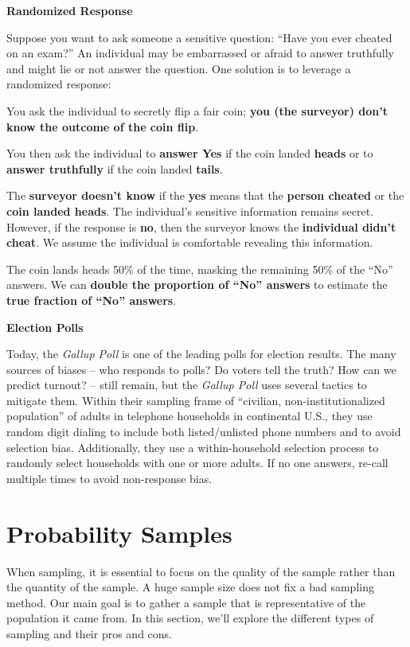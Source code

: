 \documentclass[
  letterpaper,
  DIV=11,
  numbers=noendperiod]{scrreprt}
\begin{document}
\textbf{Randomized Response}

Suppose you want to ask someone a sensitive question: ``Have you ever
cheated on an exam?'' An individual may be embarrassed or afraid to
answer truthfully and might lie or not answer the question. One solution
is to leverage a randomized response:

You ask the individual to secretly flip a fair coin; \textbf{you (the
surveyor) don't know the outcome of the coin flip}.

You then ask the individual to \textbf{answer Yes} if the coin landed
\textbf{heads} or to \textbf{answer truthfully} if the coin landed
\textbf{tails}.

The \textbf{surveyor doesn't know} if the \textbf{yes} means that the
\textbf{person cheated} or the \textbf{coin landed heads}. The
individual's sensitive information remains secret. However, if the
response is \textbf{no}, then the surveyor knows the \textbf{individual
didn't cheat}. We assume the individual is comfortable revealing this
information.

The coin lands heads 50\% of the time, masking the remaining 50\% of the
``No'' answers. We can \textbf{double the proportion of ``No'' answers}
to estimate the \textbf{true fraction of ``No'' answers}.

\textbf{Election Polls}

Today, the \emph{Gallup Poll} is one of the leading polls for election
results. The many sources of biases -- who responds to polls? Do voters
tell the truth? How can we predict turnout? -- still remain, but the
\emph{Gallup Poll} uses several tactics to mitigate them. Within their
sampling frame of ``civilian, non-institutionalized population'' of
adults in telephone households in continental U.S., they use random
digit dialing to include both listed/unlisted phone numbers and to avoid
selection bias. Additionally, they use a within-household selection
process to randomly select households with one or more adults. If no one
answers, re-call multiple times to avoid non-response bias.

\section{Probability Samples}\label{probability-samples}

When sampling, it is essential to focus on the quality of the sample
rather than the quantity of the sample. A huge sample size does not fix
a bad sampling method. Our main goal is to gather a sample that is
representative of the population it came from. In this section, we'll
explore the different types of sampling and their pros and cons.
\end{document}
